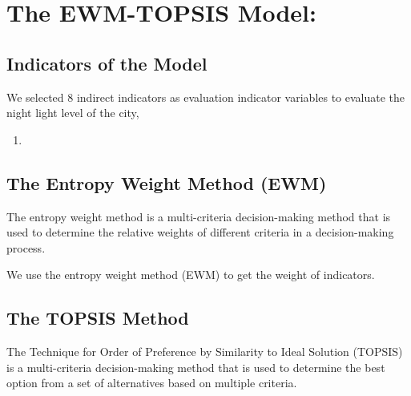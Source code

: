 \MinParskip{}

\section{The EWM-TOPSIS Model: }

\subsection{Indicators of the Model}
We selected 8 indirect indicators as evaluation indicator variables to evaluate the night light level of the city,
\begin{enumerate}
    \item 
\end{enumerate}

\subsection{The Entropy Weight Method (EWM) }
The entropy weight method is a multi-criteria decision-making method that is used to determine the relative weights of different criteria in a decision-making process.

We use the entropy weight method (EWM) to get the weight of indicators.


\subsection{The TOPSIS Method}
The Technique for Order of Preference by Similarity to Ideal Solution (TOPSIS) is a multi-criteria decision-making method that is used to determine the best option from a set of alternatives based on multiple criteria. 


